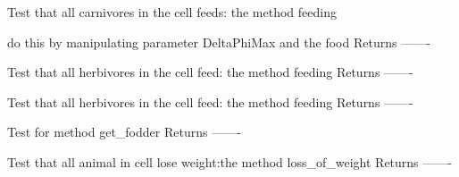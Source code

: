 \documentclass[a4paper,10pt,english]{sphinxmanual}
\begin{document}
\begin{fulllineitems}
\begin{fulllineitems}
\label{\detokenize{tests:biosim.tests.test_landscape.TestLandscape.test_feeding_carnivores}}
Test that all carnivores in the cell feeds: the method feeding

do this by manipulating parameter DeltaPhiMax and the food
Returns
-------

\end{fulllineitems}


\begin{fulllineitems}
\label{\detokenize{tests:biosim.tests.test_landscape.TestLandscape.test_feeding_jungle}}
Test that all herbivores in the cell feed: the method feeding
Returns
-------

\end{fulllineitems}


\begin{fulllineitems}
\label{\detokenize{tests:biosim.tests.test_landscape.TestLandscape.test_feeding_savannah}}
Test that all herbivores in the cell feed: the method feeding
Returns
-------

\end{fulllineitems}


\begin{fulllineitems}
\label{\detokenize{tests:biosim.tests.test_landscape.TestLandscape.test_get_fodder}}
Test for method get\_fodder
Returns
-------

\end{fulllineitems}


\begin{fulllineitems}
\label{\detokenize{tests:biosim.tests.test_landscape.TestLandscape.test_loss_of_weight}}
Test that all animal in cell lose weight:the method loss\_of\_weight
Returns
-------


\end{fulllineitems}
\end{fulllineitems}
\end{document}
